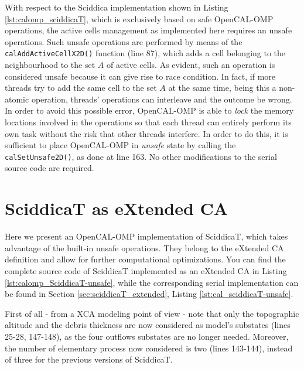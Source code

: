 With respect to the Sciddica implementation shown in Listing
\ref{lst:calomp_sciddicaT}, which is exclusively based on safe
OpenCAL-OMP operations, the active cells management as implemented
here requires an unsafe operations. Such unsafe operations are
performed by means of the \verb'calAddActiveCellX2D()' function (line
87), which adds a cell belonging to the neighbourhood to the set $A$
of active cells. As evident, such an operation is considered unsafe because it can
give rise to race condition. In fact, if more threads try to add the
same cell to the set $A$ at the same time, being this a non-atomic
operation, threads' operations can interleave and the outcome be
wrong. In order to avoid this possible error, OpenCAL-OMP is able to
\emph{lock} the memory locations involved in the operations so that
each thread can entirely perform its own task without the risk that other
threads interfere. In order to do this, it is sufficient to place
OpenCAL-OMP in \emph{unsafe} state by calling the
\verb'calSetUnsafe2D()', as done at line 163. No other modifications
to the serial source code are required.

\section{SciddicaT as eXtended CA}
Here we present an OpenCAL-OMP implementation of SciddicaT, which takes
advantage of the built-in unsafe operations. They belong to the
eXtended CA definition and allow for further computational
optimizations. You can find the complete source code of SciddicaT
implemented as an eXtended CA in Listing
\ref{lst:calomp_SciddicaT-unsafe}, while the corresponding serial
implementation can be found in Section \ref{sec:sciddicaT_extended},
Listing \ref{lst:cal_sciddicaT-unsafe}.



First of all - from a XCA modeling point of view - note that only the topographic altitude and the debris
thickness are now considered as model's substates (lines 25-28,
147-148), as the four outflows substates are no longer
needed. Moreover, the number of elementary process now considered is
two (lines 143-144), instead of three for the previous versions of
SciddicaT.

